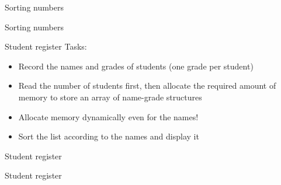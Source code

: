 \documentclass[usenames,dvipsnames,aspectratio=169]{beamer}
\begin{document}
\begin{frame}{Sorting numbers}
  \begin{exampleblock}{}
    
  \end{exampleblock}
\end{frame}

\begin{frame}{Sorting numbers}
  \footnotesize
  \begin{exampleblock}{}
    
  \end{exampleblock}
\end{frame}

\begin{frame}{Student register}
  Tasks:
  \begin{itemize}
    \item Record the names and grades of students (one grade per student)
    \item Read the number of students first, then allocate the required amount of memory to store an array of name-grade structures
    \item Allocate memory dynamically even for the names!
    \item Sort the list according to the names and display it
  \end{itemize}
\end{frame}

\begin{frame}{Student register}
  \footnotesize
  \begin{exampleblock}{}
    
    
  \end{exampleblock}
\end{frame}

\begin{frame}{Student register}
  \scriptsize
  \begin{exampleblock}{}
    \vspace{-.3cm}
    
    \vspace{-.3cm}
  \end{exampleblock}
\end{frame}
\end{document}
